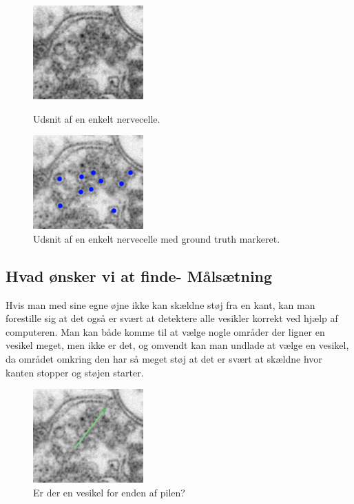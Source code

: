 \begin{figure}[H]
	\begin{minipage}[b]{0.5\linewidth}
		\centering
		\includegraphics[scale=1.5]{files/intro/img/celle.png}
		\caption{Udsnit af en enkelt nervecelle.\label{fig:intro_celle}}
	\end{minipage}
	\hspace{0.5cm}
	\begin{minipage}[b]{0.5\linewidth}
		\centering
		\includegraphics[scale=1.5]{files/intro/img/celle_groundtruth.png}
		\caption{Udsnit af en enkelt nervecelle med ground truth markeret.\label{fig:intro_celle_groundtruth}}
	\end{minipage}
\end{figure}
  

\subsection{Hvad ønsker vi at finde- Målsætning}
Hvis man med sine egne øjne ikke kan skældne støj fra en kant, kan man forestille sig at det også er svært at detektere alle vesikler korrekt ved hjælp af computeren. Man kan både komme til at vælge nogle områder der ligner en vesikel meget, men ikke er det, og omvendt kan man undlade at vælge en vesikel, da området omkring den har så meget støj at det er svært at skældne hvor kanten stopper og støjen starter.

\begin{figure}[H]
	\centering
	\includegraphics[scale=1.5]{files/intro/img/celle_questionves.png}
	\caption{Er der en vesikel for enden af pilen?\label{fig:intro_celle_question}}
\end{figure}

